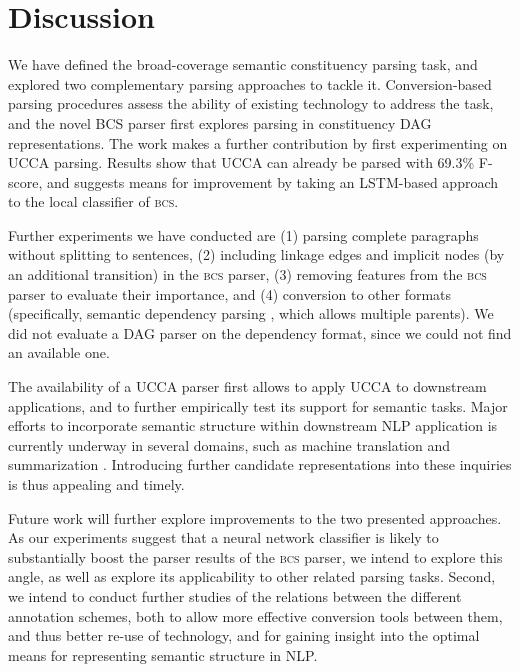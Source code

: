 \documentclass[11pt]{article}
\begin{document}
\section{Discussion}\label{sec:discussion}

We have defined the broad-coverage semantic constituency parsing task,
and explored two complementary parsing approaches to tackle it.
Conversion-based parsing procedures assess the ability of existing
technology to address the task, and the novel \textsc{BCS} parser first
explores parsing in constituency DAG representations.
The work makes a further contribution by first experimenting on UCCA parsing.
Results show that UCCA can already be parsed with 69.3\% F-score,
and suggests means for improvement by taking an LSTM-based
approach to the local classifier of \textsc{bcs}.

Further experiments we have conducted are
(1) parsing complete paragraphs without splitting to sentences,
(2) including linkage edges and implicit nodes (by an additional transition) in the \textsc{bcs} parser,
(3) removing features from the \textsc{bcs} parser to evaluate their importance,
and (4) conversion to other formats (specifically, semantic dependency parsing \cite{oepen2015semeval}, which allows multiple parents).
We did not evaluate a DAG parser \cite{tokgoz2015transition} on the dependency format, since we could not find an available one.

The availability of a UCCA parser first allows to apply UCCA to downstream applications,
and to further empirically test its support for semantic tasks.
Major efforts to incorporate semantic structure within downstream NLP application
is currently underway in several
domains, such as machine translation \cite{jones2012semantics} and
summarization \cite{liu2015toward}.
Introducing further candidate representations into these inquiries
is thus appealing and timely.

Future work will further explore improvements to the two presented approaches.
As our experiments suggest that a neural network classifier is likely to substantially boost the parser
results of the \textsc{bcs} parser, we intend to explore this angle, as well as explore its applicability
to other related parsing tasks. Second, we intend to conduct further studies of the relations
between the different annotation schemes, both to allow more effective conversion tools between
them, and thus better re-use of technology, and for gaining insight into the optimal means for
representing semantic structure in NLP.
\end{document}
